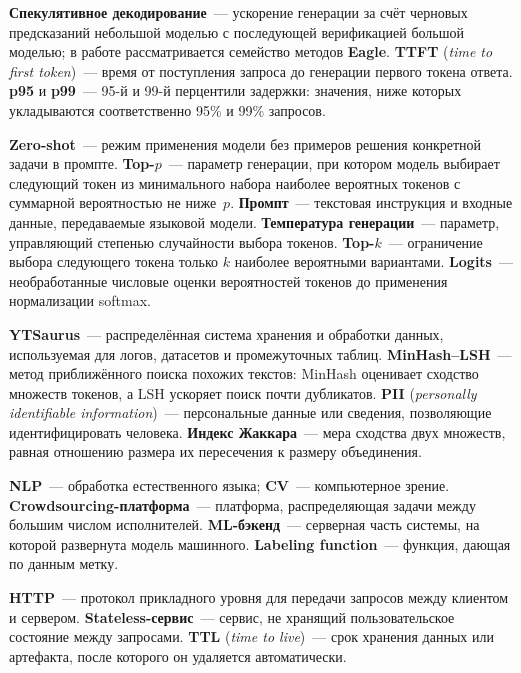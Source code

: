 \documentclass[times]{itmo-student-thesis}
\begin{document}
\medskip\noindent\textbf{Спекулятивное декодирование}~--- ускорение генерации за счёт
черновых предсказаний небольшой моделью с последующей верификацией большой моделью;
в работе рассматривается семейство методов \textbf{Eagle}.
\textbf{TTFT} (\emph{time to first token})~--- время от поступления запроса
до генерации первого токена ответа.
\textbf{p95} и \textbf{p99}~--- 95-й и 99-й перцентили задержки: значения,
ниже которых укладываются соответственно 95\% и 99\% запросов.

\medskip\noindent\textbf{Zero-shot}~--- режим применения модели без примеров
решения конкретной задачи в промпте. \textbf{Top-$p$}~--- параметр генерации,
при котором модель выбирает следующий токен из минимального набора наиболее
вероятных токенов с суммарной вероятностью не ниже~$p$.
\textbf{Промпт}~--- текстовая инструкция и входные данные, передаваемые
языковой модели. \textbf{Температура генерации}~--- параметр, управляющий
степенью случайности выбора токенов. \textbf{Top-$k$}~--- ограничение выбора
следующего токена только $k$ наиболее вероятными вариантами.
\textbf{Logits}~--- необработанные числовые оценки вероятностей токенов до
применения нормализации softmax.

\medskip\noindent\textbf{YTSaurus}~--- распределённая система хранения и
обработки данных, используемая для логов, датасетов и промежуточных таблиц.
\textbf{MinHash--LSH}~--- метод приближённого поиска похожих текстов:
MinHash оценивает сходство множеств токенов, а LSH ускоряет поиск почти
дубликатов. \textbf{PII} (\emph{personally identifiable information})~---
персональные данные или сведения, позволяющие идентифицировать человека.
\textbf{Индекс Жаккара}~--- мера сходства двух множеств, равная отношению
размера их пересечения к размеру объединения.

\medskip\noindent\textbf{NLP}~--- обработка естественного языка;
\textbf{CV}~--- компьютерное зрение. \textbf{Crowdsourcing-платформа}~---
платформа, распределяющая задачи между большим числом исполнителей.
\textbf{ML-бэкенд}~--- серверная часть системы, на которой развернута модель машинного.
\textbf{Labeling function}~--- функция, дающая по данным метку.

\medskip\noindent\textbf{HTTP}~--- протокол прикладного уровня для передачи запросов между клиентом
и сервером. \textbf{Stateless-сервис}~--- сервис, не хранящий пользовательское
состояние между запросами.
\textbf{TTL} (\emph{time to live})~--- срок хранения данных или артефакта,
после которого он удаляется автоматически.
\end{document}
